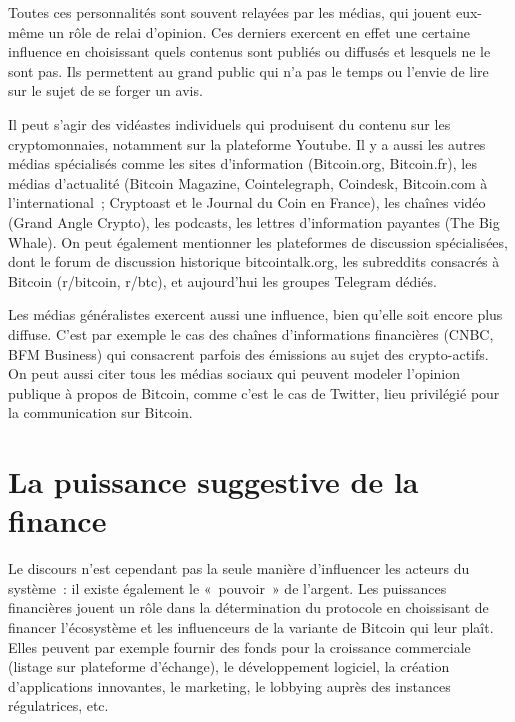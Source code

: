 Toutes ces personnalités sont souvent relayées par les médias, qui jouent eux-même un rôle de relai d'opinion. Ces derniers exercent en effet une certaine influence en choisissant quels contenus sont publiés ou diffusés et lesquels ne le sont pas. Ils permettent au grand public qui n'a pas le temps ou l'envie de lire sur le sujet de se forger un avis.

Il peut s'agir des vidéastes individuels qui produisent du contenu sur les cryptomonnaies, notamment sur la plateforme Youtube. Il y a aussi les autres médias spécialisés comme les sites d'information (Bitcoin.org, Bitcoin.fr), les médias d'actualité (Bitcoin Magazine, Cointelegraph, Coindesk, Bitcoin.com à l'international~; Cryptoast et le Journal du Coin en France), les chaînes vidéo (Grand Angle Crypto), les podcasts, les lettres d'information payantes (The Big Whale). On peut également mentionner les plateformes de discussion spécialisées, dont le forum de discussion historique bitcointalk.org, les subreddits consacrés à Bitcoin (r/bitcoin, r/btc), et aujourd'hui les groupes Telegram dédiés.

Les médias généralistes exercent aussi une influence, bien qu'elle soit encore plus diffuse. C'est par exemple le cas des chaînes d'informations financières (CNBC, BFM Business) qui consacrent parfois des émissions au sujet des crypto-actifs. On peut aussi citer tous les médias sociaux qui peuvent modeler l'opinion publique à propos de Bitcoin, comme c'est le cas de Twitter, lieu privilégié pour la communication sur Bitcoin.

\section*{La puissance suggestive de la finance} %

Le discours n'est cependant pas la seule manière d'influencer les acteurs du système~: il existe également le «~pouvoir~» de l'argent. Les puissances financières jouent un rôle dans la détermination du protocole en choissisant de financer l'écosystème et les influenceurs de la variante de Bitcoin qui leur plaît. Elles peuvent par exemple fournir des fonds pour la croissance commerciale (listage sur plateforme d'échange), le développement logiciel, la création d'applications innovantes, le marketing, le lobbying auprès des instances régulatrices, etc.

